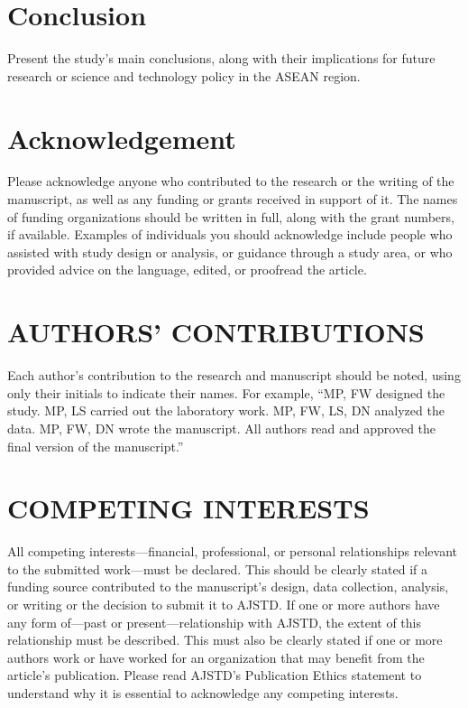 \documentclass[twocolumn]{sintr}
\begin{document}
\lipsum[1]


\section{Conclusion}

Present the study's main conclusions, along with their implications for future research or science and technology policy in the ASEAN region.

\section*{Acknowledgement}

Please acknowledge anyone who contributed to the research or the writing of the manuscript, as well as any funding or grants received in support of it. The names of funding organizations should be written in full, along with the grant numbers, if available. Examples of individuals you should acknowledge include people who assisted with study design or analysis, or guidance through a study area, or who provided advice on the language, edited, or proofread the article.

\lipsum[2-10]

\section*{AUTHORS’ CONTRIBUTIONS}

Each author’s contribution to the research and manuscript should be noted, using only their initials to indicate their names. For example, “MP, FW designed the study. MP, LS carried out the laboratory work. MP, FW, LS, DN analyzed the data. MP, FW, DN wrote the manuscript. All authors read and approved the final version of the manuscript.”

\section*{COMPETING INTERESTS}

All competing interests—financial, professional, or personal relationships relevant to the submitted work—must be declared. This should be clearly stated if a funding source contributed to the manuscript's design, data collection, analysis, or writing or the decision to submit it to AJSTD. If one or more authors have any form of—past or present—relationship with AJSTD, the extent of this relationship must be described. This must also be clearly stated if one or more authors work or have worked for an organization that may benefit from the article's publication. Please read AJSTD’s Publication Ethics statement to understand why it is essential to acknowledge any competing interests.
\end{document}

